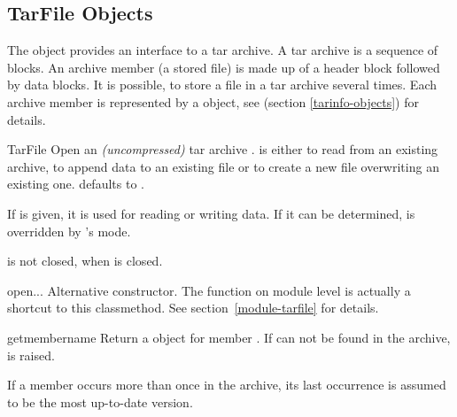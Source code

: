 \begin{seealso}

\end{seealso}


\subsection{TarFile Objects \label{tarfile-objects}}

The  object provides an interface to a tar archive. A tar
archive is a sequence of blocks. An archive member (a stored file) is made up
of a header block followed by data blocks. It is possible, to store a file in a
tar archive several times. Each archive member is represented by a
 object, see  (section
\ref{tarinfo-objects}) for details.

\begin{classdesc}{TarFile}{}
    Open an \emph{(uncompressed)} tar archive .
     is either  to read from an existing archive,
     to append data to an existing file or  to create a new
    file overwriting an existing one.  defaults to .

    If  is given, it is used for reading or writing data.
    If it can be determined,  is overridden by 's mode.
    \begin{notice}
         is not closed, when  is closed.
    \end{notice}
\end{classdesc}

\begin{methoddesc}{open}{...}
    Alternative constructor. The  function on module level is
    actually a shortcut to this classmethod. See section~\ref{module-tarfile}
    for details.
\end{methoddesc}

\begin{methoddesc}{getmember}{name}
    Return a  object for member . If  can
    not be found in the archive,  is raised.
    \begin{notice}
        If a member occurs more than once in the archive, its last
        occurrence is assumed to be the most up-to-date version.
    \end{notice}
\end{methoddesc}

